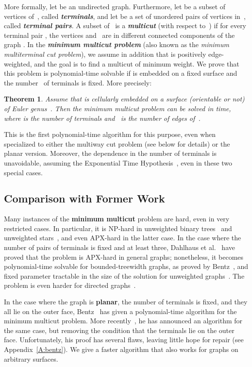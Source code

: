 \documentclass[11pt]{article}
\newcommand{\emphdef}[1]{\textcolor{blueblack}{\textbf{\emph{#1}}}}
\theoremstyle{plain}  \newtheorem{theorem}{Theorem}[section]
\theoremstyle{definition}
\begin{document}
More formally, let  be an undirected graph.  Furthermore, let 
be a subset of vertices of~, called \emphdef{terminals}, and let  be
a set of unordered pairs of vertices in~, called \emphdef{terminal
  pairs}.  A subset  of~ is a \emphdef{multicut} (with respect
to~) if for every terminal pair , the vertices 
and~ are in different connected components of the graph .  In the \emphdef{minimum multicut problem} (also known as the
\emph{minimum multiterminal cut problem}), we assume in addition that 
is positively edge-weighted, and the goal is to find a multicut of minimum
weight.  We prove that this problem is polynomial-time solvable if  is
embedded on a fixed surface and the number~ of terminals is fixed.  More
precisely:
\begin{theorem}\label{T:main}
  Assume that  is cellularly embedded on a surface (orientable or not)
  of Euler genus~.  Then the minimum multicut problem can be solved in
   time, where  is
  the number of terminals and ~is the number of edges of~.
\end{theorem}
This is the first polynomial-time algorithm for this purpose, even when
specialized to either the multiway cut problem (see below for details) or
the planar version.  Moreover, the  dependence in the
number of terminals is unavoidable, assuming the Exponential Time
Hypothesis~\cite{m-tlbpm-12}, even in these two special cases.

\subsection*{Comparison with Former Work}

Many instances of the \textbf{minimum multicut} problem are hard, even in
very restricted cases.  In particular, it is NP-hard in unweighted binary
trees~\cite{cfr-mugdb-03} and unweighted
stars~\cite[Theorem~3.1]{gvy-pdaai-97}, and even APX-hard in the latter
case.  In the case where the number of pairs of terminals is fixed and at
least three, Dahlhaus et al.~\cite{djpsy-cmc-94} have proved that the
problem is APX-hard in general graphs; nonetheless, it becomes
polynomial-time solvable for bounded-treewidth graphs, as proved by
Bentz~\cite[Theorem~1]{b-cmpbt-08}, and fixed parameter tractable in the
size of the solution for unweighted graphs~\cite{bdt-mf-11}.  The problem
is even harder for directed graphs~\cite{b-cmpbt-08}.

\smallskip

In the case where the graph is \textbf{planar}, the number of terminals is
fixed, and they all lie on the outer face, Bentz~\cite{b-sampg-09} has
given a polynomial-time algorithm for the minimum multicut problem.  More
recently~\cite{b-ptapm-12}, he has announced an algorithm for the same
case, but removing the condition that the terminals lie on the outer face.
Unfortunately, his proof has several flaws, leaving little hope for repair
(see Appendix~\ref{A:bentz}).  We give a faster algorithm that also works
for graphs on arbitrary surfaces.
\end{document}
